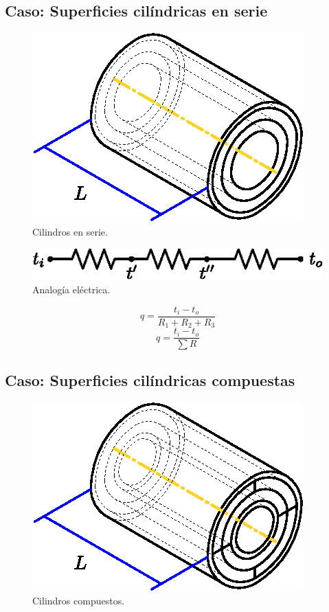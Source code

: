 \subsection{Caso: Superficies cilíndricas en serie}
\begin{figure}[!h]
\centering
\includegraphics[scale=1.10]{figura02_11.eps}
\caption{Cilindros en serie.}
\end{figure}

\begin{figure}[!h]
\centering
\includegraphics[scale=1.10]{figura02_12.eps}
\caption{Analogía eléctrica.}
\end{figure}

\begin{equation*}
    q=\frac{t_i-t_o}{R_1+R_2+R_3}
\end{equation*}
\begin{equation*}
    q=\frac{t_i-t_o}{\sum R}
\end{equation*}

\subsection{Caso: Superficies cilíndricas compuestas}
\begin{figure}[!h]
\centering
\includegraphics[scale=1.10]{figura02_13.eps}
\caption{Cilindros compuestos.}
\end{figure}

